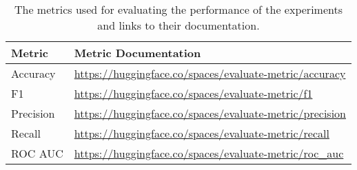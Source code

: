 \begin{table}[ht]
    \captionsetup{font=small}
    \centering
    \begin{tabularx}{\textwidth}{|l|X|}
        \hline
        \rowcolor[gray]{0.7}
        \textbf{Metric}            & \textbf{Metric Documentation}                                   \\
        \hline

        Accuracy               & \small{\url{https://huggingface.co/spaces/evaluate-metric/accuracy}}            \\
        \hline
        F1       & \small{\url{https://huggingface.co/spaces/evaluate-metric/f1}}         \\
        \hline
        Precision                 & \small{\url{https://huggingface.co/spaces/evaluate-metric/precision}}       \\
        \hline
        Recall             & \small{\url{https://huggingface.co/spaces/evaluate-metric/recall}}       \\
        \hline
        ROC AUC & \small{\url{https://huggingface.co/spaces/evaluate-metric/roc_auc}}   \\
        \hline
    \end{tabularx}
    \caption{The metrics used for evaluating the performance of the experiments and links to their documentation.}
    \label{tab: apdx_metric_doc}
\end{table}